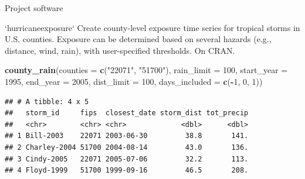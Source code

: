 \documentclass[ignorenonframetext,]{beamer}
\newenvironment{Shaded}{\begin{snugshade}}{\end{snugshade}}
\newcommand{\KeywordTok}[1]{\textcolor[rgb]{0.13,0.29,0.53}{\textbf{#1}}}
\newcommand{\DataTypeTok}[1]{\textcolor[rgb]{0.13,0.29,0.53}{#1}}
\newcommand{\DecValTok}[1]{\textcolor[rgb]{0.00,0.00,0.81}{#1}}
\newcommand{\StringTok}[1]{\textcolor[rgb]{0.31,0.60,0.02}{#1}}
\newcommand{\OperatorTok}[1]{\textcolor[rgb]{0.81,0.36,0.00}{\textbf{#1}}}
\newcommand{\NormalTok}[1]{#1}
\begin{document}
\begin{frame}[fragile]{Project software}

\footnotesize

\begin{block}{`hurricaneexposure`}
Create county-level exposure time series for tropical storms in U.S. counties. Exposure can be determined based on several hazards (e.g., distance, wind, rain), with user-specified thresholds. On CRAN.
\end{block}

\begin{Shaded}
\begin{Highlighting}[]
\KeywordTok{county_rain}\NormalTok{(}\DataTypeTok{counties =} \KeywordTok{c}\NormalTok{(}\StringTok{"22071"}\NormalTok{, }\StringTok{"51700"}\NormalTok{), }\DataTypeTok{rain_limit =} \DecValTok{100}\NormalTok{, }
            \DataTypeTok{start_year =} \DecValTok{1995}\NormalTok{, }\DataTypeTok{end_year =} \DecValTok{2005}\NormalTok{, }\DataTypeTok{dist_limit =} \DecValTok{100}\NormalTok{,}
            \DataTypeTok{days_included =} \KeywordTok{c}\NormalTok{(}\OperatorTok{-}\DecValTok{1}\NormalTok{, }\DecValTok{0}\NormalTok{, }\DecValTok{1}\NormalTok{))}
\end{Highlighting}
\end{Shaded}

\begin{verbatim}
## # A tibble: 4 x 5
##   storm_id     fips  closest_date storm_dist tot_precip
##   <chr>        <chr> <chr>             <dbl>      <dbl>
## 1 Bill-2003    22071 2003-06-30         38.8       141.
## 2 Charley-2004 51700 2004-08-14         43.0       136.
## 3 Cindy-2005   22071 2005-07-06         32.2       113.
## 4 Floyd-1999   51700 1999-09-16         46.5       208.
\end{verbatim}

\end{frame}
\end{document}
